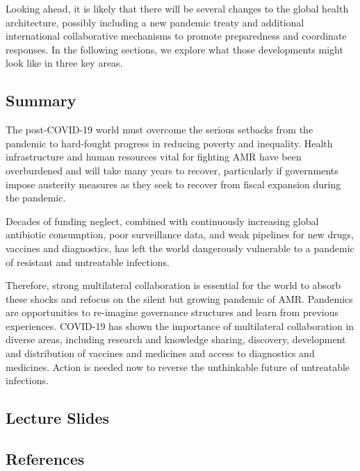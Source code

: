 \documentclass[]{tufte-handout}
\begin{document}
Looking ahead, it is likely that there will be several changes to the
global health architecture, possibly including a new pandemic treaty and
additional international collaborative mechanisms to promote
preparedness and coordinate responses. In the following sections, we
explore what those developments might look like in three key areas.

\hypertarget{summary}{%
\subsection*{Summary}\label{summary}}

The post-COVID-19 world must overcome the serious setbacks from the
pandemic to hard-fought progress in reducing poverty and inequality.
Health infrastructure and human resources vital for fighting AMR have
been overburdened and will take many years to recover, particularly if
governments impose austerity measures as they seek to recover from
fiscal expansion during the pandemic.

Decades of funding neglect, combined with continuously increasing global
antibiotic consumption, poor surveillance data, and weak pipelines for
new drugs, vaccines and diagnostics, has left the world dangerously
vulnerable to a pandemic of resistant and untreatable infections.

Therefore, strong multilateral collaboration is essential for the world
to absorb these shocks and refocus on the silent but growing pandemic of
AMR. Pandemics are opportunities to re-imagine governance structures and
learn from previous experiences. COVID-19 has shown the importance of
multilateral collaboration in diverse areas, including research and
knowledge sharing, discovery, development and distribution of vaccines
and medicines and access to diagnostics and medicines. Action is needed
now to reverse the unthinkable future of untreatable infections.

\hypertarget{lecture-slides}{%
\subsection*{Lecture Slides}\label{lecture-slides}}

\hypertarget{references}{%
\subsection*{References}\label{references}}
\end{document}
